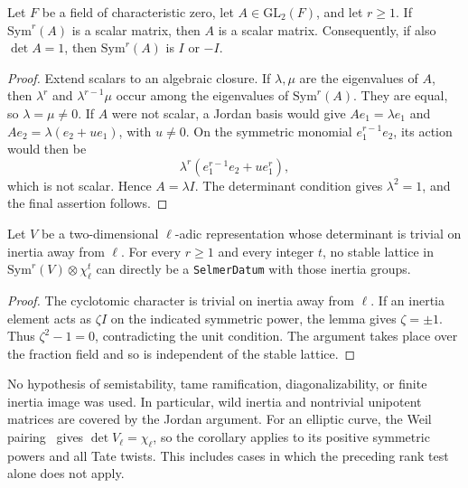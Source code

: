\begin{lemma}
Let $F$ be a field of characteristic zero, let $A\in\mathrm{GL}_2(F)$,
and let $r\geq1$. If $\mathrm{Sym}^r(A)$ is a scalar matrix, then $A$
is a scalar matrix. Consequently, if also $\det A=1$, then
$\mathrm{Sym}^r(A)$ is $I$ or $-I$.
\end{lemma}
\begin{proof}
Extend scalars to an algebraic closure. If $\lambda,\mu$ are the eigenvalues
of $A$, then $\lambda^r$ and $\lambda^{r-1}\mu$ occur among the eigenvalues
of $\mathrm{Sym}^r(A)$. They are equal, so $\lambda=\mu\neq0$.
If $A$ were not scalar, a Jordan basis would give
$Ae_1=\lambda e_1$ and $Ae_2=\lambda(e_2+u e_1)$, with $u\neq0$.
On the symmetric monomial $e_1^{r-1}e_2$, its action would then be
\[
 \lambda^r(e_1^{r-1}e_2+u e_1^r),
\]
which is not scalar. Hence $A=\lambda I$. The determinant condition gives
$\lambda^2=1$, and the final assertion follows.
\end{proof}

\begin{corollary}
Let $V$ be a two-dimensional $\ell$-adic representation whose determinant
is trivial on inertia away from $\ell$. For every $r\geq1$ and every
integer $t$, no stable lattice in
$\mathrm{Sym}^r(V)\otimes\chi_\ell^t$ can directly be a
\texttt{SelmerDatum} with those inertia groups.
\end{corollary}
\begin{proof}
The cyclotomic character is trivial on inertia away from $\ell$. If an
inertia element acts as $\zeta I$ on the indicated symmetric power, the
lemma gives $\zeta=\pm1$. Thus $\zeta^2-1=0$, contradicting the unit
condition. The argument takes place over the fraction field and so is
independent of the stable lattice.
\end{proof}

No hypothesis of semistability, tame ramification, diagonalizability, or
finite inertia image was used. In particular, wild inertia and nontrivial
unipotent matrices are covered by the Jordan argument. For an elliptic
curve, the Weil pairing~\cite{milne} gives $\det V_\ell=\chi_\ell$, so the corollary
applies to its positive symmetric powers and all Tate twists. This
includes cases in which the preceding rank test alone does not apply.

